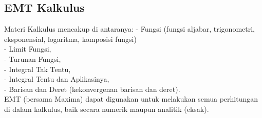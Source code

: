\documentclass[12pt,Times new roman,letterpaper]{book}
\begin{document}
\begin{eulernootebook}
\begin{eulercomment}
\begin{eulercomment}
\begin{eulernootebook}
\begin{eulercomment}
\begin{eulercomment}
\begin{eulercomment}
\begin{eulercomment}
\begin{eulercomment}
\begin{eulercomment}
\chapter{EMT Kalkulus}
\begin{eulernotebook}
\begin{eulercomment}
Materi Kalkulus mencakup di antaranya: - Fungsi (fungsi aljabar,
trigonometri, eksponensial, logaritma, komposisi fungsi)\\
- Limit Fungsi,\\
- Turunan Fungsi,\\
- Integral Tak Tentu,\\
- Integral Tentu dan Aplikasinya,\\
- Barisan dan Deret (kekonvergenan barisan dan deret).\\
EMT (bersama Maxima) dapat digunakan untuk melakukan semua perhitungan
di dalam kalkulus, baik secara numerik maupun analitik (eksak).


\end{eulercomment}
\end{eulernotebook}
\end{eulercomment}
\end{eulercomment}
\end{eulercomment}
\end{eulercomment}
\end{eulercomment}
\end{eulercomment}
\end{eulernootebook}
\end{eulercomment}
\end{eulercomment}
\end{eulernootebook}
\end{document}

